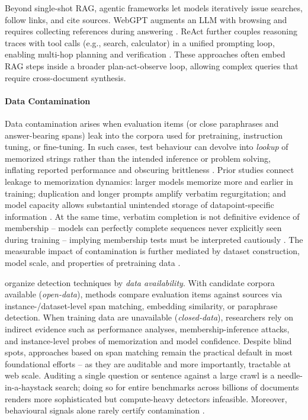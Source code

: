 Beyond single-shot RAG, agentic frameworks let models iteratively issue searches, follow links, and cite sources. WebGPT augments an LLM with browsing and requires collecting references during answering \cite{nakanoWebGPTBrowserassistedQuestionanswering2022a}. ReAct further couples reasoning traces with tool calls (e.g., search, calculator) in a unified prompting loop, enabling multi-hop planning and verification \cite{yaoReActSynergizingReasoning2023a}. These approaches often embed RAG steps inside a broader plan-act-observe loop, allowing complex queries that require cross-document synthesis.


\paragraph{\textbf{Data Contamination}}
Data contamination arises when evaluation items (or close paraphrases and answer-bearing spans) leak into the corpora used for pretraining, instruction tuning, or fine-tuning. In such cases, test behaviour can devolve into \emph{lookup} of memorized strings rather than the intended inference or problem solving, inflating reported performance and obscuring brittleness \cite{ravautComprehensiveSurveyContamination2025a,liOpenSourceData2024}. Prior studies connect leakage to memorization dynamics: larger models memorize more and earlier in training; duplication and longer prompts amplify verbatim regurgitation; and model capacity allows substantial unintended storage of datapoint-specific information \cite{carliniQuantifyingMemorizationNeural2023,tirumalaMemorizationOverfittingAnalyzing2022,morrisHowMuchLanguage2025}. At the same time, verbatim completion is not definitive evidence of membership -- models can perfectly complete sequences never explicitly seen during training -- implying membership tests must be interpreted cautiously \cite{liuLanguageModelsMay2025}. The measurable impact of contamination is further mediated by dataset construction, model scale, and properties of pretraining data \cite{liOpenSourceData2024}.

\citet{ravautComprehensiveSurveyContamination2025a} organize detection techniques by \emph{data availability}. With candidate corpora available (\emph{open-data}), methods compare evaluation items against sources via instance-/dataset-level span matching, embedding similarity, or paraphrase detection. When training data are unavailable (\emph{closed-data}), researchers rely on indirect evidence such as performance analyses, membership-inference attacks, and instance-level probes of memorization and model confidence. Despite blind spots, approaches based on span matching remain the practical default in most foundational efforts \cite{dodgeDocumentingLargeWebtext2021,radfordLanguageModelsAre,brownLanguageModelsAre2020,openaiGPT4TechnicalReport2024,chowdheryPaLMScalingLanguage2022,leePlatypusQuickCheap2024} -- as they are auditable and more importantly, tractable at web scale. Auditing a single question or sentence against a large crawl is a needle-in-a-haystack search; doing so for entire benchmarks across billions of documents renders more sophisticated but compute-heavy detectors infeasible. Moreover, behavioural signals alone rarely certify contamination \cite{liOpenSourceData2024,liuLanguageModelsMay2025}.

